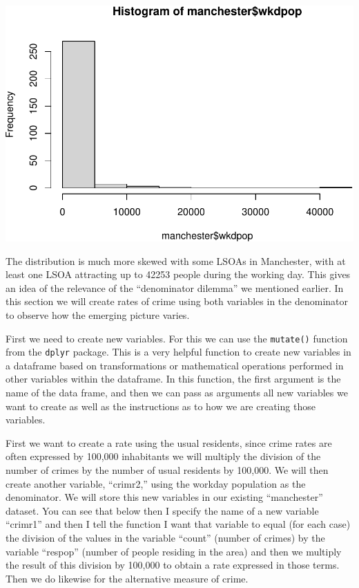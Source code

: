 \documentclass[
]{book}
\makeatletter
\newenvironment{Shaded}{\begin{snugshade}}{\end{snugshade}}
\newcommand{\FunctionTok}[1]{\textcolor[rgb]{0,0,0}{#1}}
\newcommand{\NormalTok}[1]{#1}
\newcommand{\SpecialCharTok}[1]{\textcolor[rgb]{0,0,0}{#1}}
\newenvironment{kframe}{%
\medskip{}
\setlength{\fboxsep}{.8em}
 \def\at@end@of@kframe{}%
 \ifinner\ifhmode%
  \def\at@end@of@kframe{\end{minipage}}%
  \begin{minipage}{\columnwidth}%
 \fi\fi%
 \def\FrameCommand##1{\hskip\@totalleftmargin \hskip-\fboxsep
 \colorbox{shadecolor}{##1}\hskip-\fboxsep
     \hskip-\linewidth \hskip-\@totalleftmargin \hskip\columnwidth}%
 \MakeFramed {\advance\hsize-\width
   \@totalleftmargin\z@ \linewidth\hsize
   \@setminipage}}%
 {\par\unskip\endMakeFramed%
 \at@end@of@kframe}
\renewenvironment{Shaded}{\begin{kframe}}{\end{kframe}}
\makeatother
\begin{document}
\begin{Shaded}
\end{Shaded}

\includegraphics{crime_mapping_files/figure-latex/unnamed-chunk-82-1.pdf}

The distribution is much more skewed with some LSOAs in Manchester, with at least one LSOA attracting up to 42253 people during the working day. This gives an idea of the relevance of the ``denominator dilemma'' we mentioned earlier. In this section we will create rates of crime using both variables in the denominator to observe how the emerging picture varies.

First we need to create new variables. For this we can use the \texttt{mutate()} function from the \texttt{dplyr} package. This is a very helpful function to create new variables in a dataframe based on transformations or mathematical operations performed in other variables within the dataframe. In this function, the first argument is the name of the data frame, and then we can pass as arguments all new variables we want to create as well as the instructions as to how we are creating those variables.

First we want to create a rate using the usual residents, since crime rates are often expressed by 100,000 inhabitants we will multiply the division of the number of crimes by the number of usual residents by 100,000. We will then create another variable, ``crimr2,'' using the workday population as the denominator. We will store this new variables in our existing ``manchester'' dataset. You can see that below then I specify the name of a new variable ``crimr1'' and then I tell the function I want that variable to equal (for each case) the division of the values in the variable ``count'' (number of crimes) by the variable ``respop'' (number of people residing in the area) and then we multiply the result of this division by 100,000 to obtain a rate expressed in those terms. Then we do likewise for the alternative measure of crime.
\end{document}
